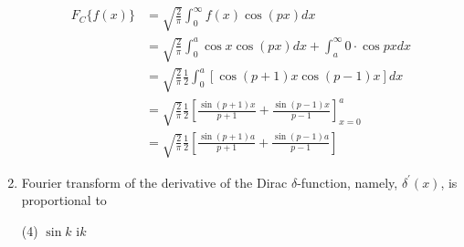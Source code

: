 \begin{enumerate}
\begin{answer}
	\begin{align*}
	F_{C}\{f(x)\} &=\sqrt{\frac{2}{\pi}} \int_{0}^{\infty} f(x) \cos (p x) d x \\
	&=\sqrt{\frac{2}{\pi}} \int_{0}^{a} \cos x \cos (p x) d x+\int_{a}^{\infty} 0 \cdot \cos p x d x \\
	&=\sqrt{\frac{2}{\pi}} \frac{1}{2} \int_{0}^{a}[\cos (p+1) x \cos (p-1) x] d x\\
	&=\sqrt{\frac{2}{\pi}} \frac{1}{2}\left[\frac{\sin (p+1) x}{p+1}+\frac{\sin (p-1) x}{p-1}\right]_{x=0}^{a} \\
	&=\sqrt{\frac{2}{\pi}} \frac{1}{2}\left[\frac{\sin (p+1) a}{p+1}+\frac{\sin (p-1) a}{p-1}\right]
	\end{align*}
\end{answer}

\item	Fourier transform of the derivative of the Dirac $\delta$-function, namely, $\delta^{\prime}(x)$, is proportional to
	\begin{tasks}(4)
		\task[\textbf{c.}] $\sin k$
		\task[\textbf{d.}] $\mathrm{i} k$
	\end{tasks}


\end{enumerate}
